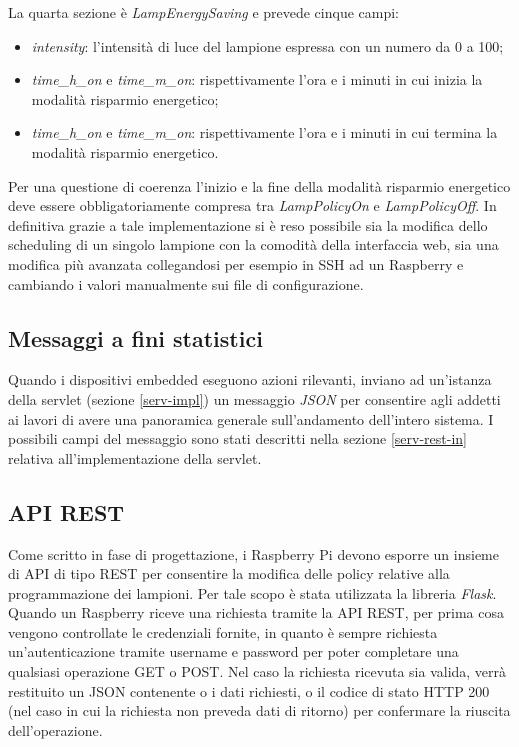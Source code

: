 La quarta sezione è \textit{LampEnergySaving} e prevede cinque campi:
\begin{itemize}
 \item \textit{intensity}: l'intensità di luce del lampione espressa con un numero da 0 a 100;
 \item \textit{time\_h\_on} e \textit{time\_m\_on}: rispettivamente l'ora e i minuti in cui inizia la modalità risparmio energetico;
 \item \textit{time\_h\_on} e \textit{time\_m\_on}: rispettivamente l'ora e i minuti in cui termina la modalità risparmio energetico.
\end{itemize}
Per una questione di coerenza l'inizio e la fine della modalità risparmio energetico deve essere obbligatoriamente compresa tra \textit{LampPolicyOn} e \textit{LampPolicyOff}.
In definitiva grazie a tale implementazione si è reso possibile sia la modifica dello scheduling di un singolo lampione con la comodità della interfaccia web, sia una modifica più avanzata collegandosi per esempio in SSH ad un Raspberry e cambiando i valori manualmente sui file di configurazione.


\newpage

\subsection{Messaggi a fini statistici}
Quando i dispositivi embedded eseguono azioni rilevanti, inviano ad un'istanza della servlet (sezione \ref{serv-impl}) un messaggio \textit{JSON} per consentire agli addetti ai lavori di avere una panoramica generale sull'andamento dell'intero sistema.
I possibili campi del messaggio sono stati descritti nella sezione \ref{serv-rest-in} relativa all'implementazione della servlet.

\subsection{API REST}
Come scritto in fase di progettazione, i Raspberry Pi devono esporre un insieme di API di tipo REST per consentire la modifica delle policy relative alla programmazione dei lampioni.
Per tale scopo è stata utilizzata la libreria \textit{Flask}.
Quando un Raspberry riceve una richiesta tramite la API REST, per prima cosa vengono controllate le credenziali fornite, in quanto è sempre richiesta un'autenticazione tramite username e password per poter completare una qualsiasi operazione GET o POST.
Nel caso la richiesta ricevuta sia valida, verrà restituito un JSON contenente o i dati richiesti, o il codice di stato HTTP 200 (nel caso in cui la richiesta non preveda dati di ritorno) per confermare la riuscita dell'operazione.

